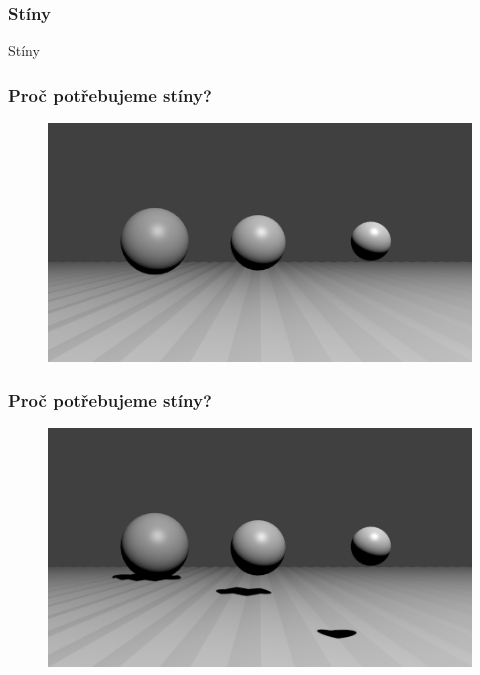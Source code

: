 \begin{frame}
\frametitle{Stíny}
\begin{center}
\Huge {\color{white}Stíny}
\end{center}
\end{frame}

\begin{frame}
  \frametitle{Proč potřebujeme stíny?}
  \begin{figure}[h]
    \includegraphics[width=11.5cm,keepaspectratio]{pics/shadows/whyShadows/noShadows}
  \end{figure}
\end{frame}

\begin{frame}
  \frametitle{Proč potřebujeme stíny?}
  \begin{figure}[h]
    \includegraphics[width=11.5cm,keepaspectratio]{pics/shadows/whyShadows/shadows}
  \end{figure}
\end{frame}

